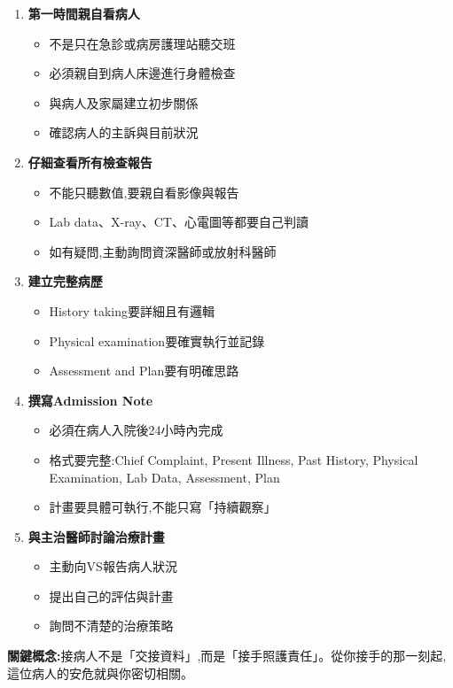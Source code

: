 \documentclass[12pt,a4paper]{article}
\newcommand{\note}[1]{
    \par
    \noindent
    \begin{tcolorbox}[
        colback=emergency_blue!5!white,
        colframe=emergency_blue,
        title=\textbf{重點提醒},
        fonttitle=\bfseries,
        boxrule=0.5pt,
        arc=3pt,
        left=6pt,
        right=6pt,
        top=6pt,
        bottom=6pt
    ]
    #1
    \end{tcolorbox}
}
\begin{document}
\begin{enumerate}[leftmargin=*]
\item \textbf{第一時間親自看病人}
\begin{itemize}
\item 不是只在急診或病房護理站聽交班
\item 必須親自到病人床邊進行身體檢查
\item 與病人及家屬建立初步關係
\item 確認病人的主訴與目前狀況
\end{itemize}

\item \textbf{仔細查看所有檢查報告}
\begin{itemize}
\item 不能只聽數值,要親自看影像與報告
\item Lab data、X-ray、CT、心電圖等都要自己判讀
\item 如有疑問,主動詢問資深醫師或放射科醫師
\end{itemize}

\item \textbf{建立完整病歷}
\begin{itemize}
\item History taking要詳細且有邏輯
\item Physical examination要確實執行並記錄
\item Assessment and Plan要有明確思路
\end{itemize}

\item \textbf{撰寫Admission Note}
\begin{itemize}
\item 必須在病人入院後24小時內完成
\item 格式要完整:Chief Complaint, Present Illness, Past History, Physical Examination, Lab Data, Assessment, Plan
\item 計畫要具體可執行,不能只寫「持續觀察」
\end{itemize}

\item \textbf{與主治醫師討論治療計畫}
\begin{itemize}
\item 主動向VS報告病人狀況
\item 提出自己的評估與計畫
\item 詢問不清楚的治療策略
\end{itemize}
\end{enumerate}

\note{
\textbf{關鍵概念:}接病人不是「交接資料」,而是「接手照護責任」。從你接手的那一刻起,這位病人的安危就與你密切相關。
}
\end{document}
